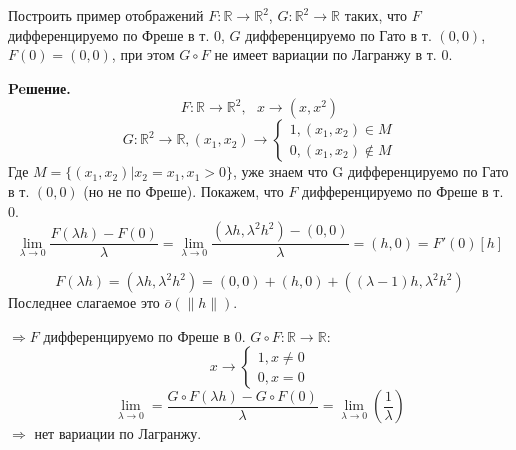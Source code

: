 \begin{task}
    Построить пример отображений $F:\mathbb{R}\rightarrow \mathbb{R}^2$, $G:\mathbb{R}^2\rightarrow \mathbb{R}$ таких, что $F$ дифференцируемо по Фреше в т. $0$, $G$ дифференцируемо по Гато в т. $(0,0)$, $F(0)=(0,0)$, при этом $G \circ F$ не имеет вариации по Лагранжу в т. 0.
    
    \textbf{Peшение.} 
    $$F:\mathbb{R}\rightarrow \mathbb{R}^2, \ \ \ x \rightarrow (x,x^2)$$
    \begin{equation*}
    G:\mathbb{R}^2\rightarrow \mathbb{R}, (x_1,x_2)\rightarrow
    \begin{cases}
        1, (x_1,x_2)\in M \\0, (x_1,x_2)\notin M
    \end{cases}
    \end{equation*}
    Где $M=\{ (x_1,x_2)|x_2=x_1,x_1>0\}$, уже знаем что G дифференцируемо по Гато в т. $(0,0)$ (но не по Фреше). Покажем, что $F$ дифференцируемо по Фреше в т. 0.
    $$\underset{\lambda \rightarrow 0}{\lim} \frac{F(\lambda h)-F (0)}{\lambda} 
        = \underset{\lambda\rightarrow0}{\lim} \frac{(\lambda h,\lambda^2 h^2)-(0,0)}{\lambda}=(h,0)=F'(0)[h]$$
    
    $$ F(\lambda h)=(\lambda h,\lambda^2 h^2)=(0,0)+(h,0)+((\lambda-1)h,\lambda^2 h^2) $$
    Последнее слагаемое это $\bar{o}(\|h \|)$.
    
    \noindent $\Rightarrow F$ дифференцируемо по Фреше в 0. $G \circ F: \mathbb{R} \rightarrow \mathbb{R}$:
     \begin{equation*}
    x\rightarrow
    \begin{cases}
        1, x\neq0\\0, x=0
    \end{cases}
    \end{equation*}
    $$\underset{\lambda\rightarrow0}{\lim}=\frac{G \circ F(\lambda h)-G \circ F(0)}{\lambda}=\underset{\lambda\rightarrow0}{\lim} \left( \frac{1}{\lambda} \right) $$
    $\Rightarrow$ нет вариации по Лагранжу.
    \end{task}
